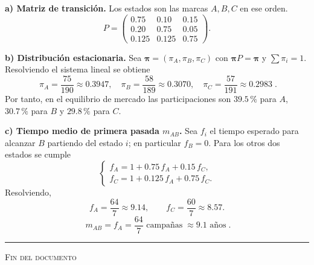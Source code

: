 \documentclass[11pt,spanish]{article}
\begin{document}
\begin{solution}
\textbf{a) Matriz de transición.}
Los estados son las marcas \(A,B,C\) en ese orden.  
\[
P=\begin{pmatrix}
      0.75 & 0.10  & 0.15\\
      0.20 & 0.75  & 0.05\\
      0.125& 0.125 & 0.75
   \end{pmatrix}.
\]

\bigskip
\textbf{b) Distribución estacionaria.}
Sea \(\bm\pi=(\pi_A,\pi_B,\pi_C)\) con \(\bm\pi P=\bm\pi\) y \(\sum\pi_i=1\).  
Resolviendo el sistema lineal se obtiene
\[
\boxed{\;\pi_A=\frac{75}{190}\approx0.3947,\quad
        \pi_B=\frac{58}{189}\approx0.3070,\quad
        \pi_C=\frac{57}{191}\approx0.2983\;} .
\]
Por tanto, en el equilibrio de mercado las participaciones son
\(39.5\,\%\) para \(A\), \(30.7\,\%\) para \(B\) y \(29.8\,\%\) para \(C\).

\bigskip
\textbf{c) Tiempo medio de primera pasada \(m_{AB}\).}
Sea \(f_i\) el tiempo esperado para alcanzar \(B\) partiendo del estado \(i\); en particular \(f_B=0\).
Para los otros dos estados se cumple
\[
\begin{cases}
f_A = 1 + 0.75\,f_A + 0.15\,f_C,\\[2pt]
f_C = 1 + 0.125\,f_A + 0.75\,f_C.
\end{cases}
\]
Resolviendo,
\[
f_A=\dfrac{64}{7}\approx9.14,\qquad
f_C=\dfrac{60}{7}\approx8.57.
\]
\[
\boxed{\;m_{AB}=f_A=\dfrac{64}{7}\text{ campañas}\;\approx9.1\text{ años}\;}.
\]

\end{solution}

\bigskip\hrule\bigskip
\begin{center}
\textsc{Fin del documento}
\end{center}
\end{document}
